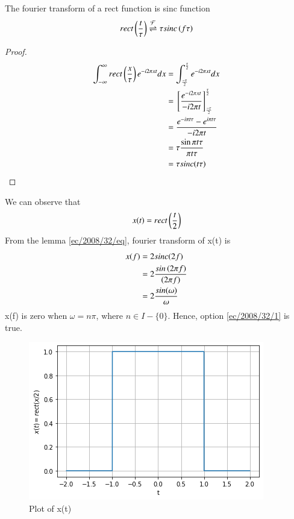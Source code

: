 
\begin{lemma}\label{ec/2008/32/eq}
The fourier transform of a rect function is sinc function 
\begin{align}
    rect\left(\frac{t}{\tau}\right) \overset{\mathcal{F}}{ \rightleftharpoons} \tau sinc\left(f\tau\right)
\end{align}
\begin{proof}
\begin{align}
    \int_{-\infty}^{\infty} rect\left(\frac{x}{\tau}\right) e^{-i2\pi xt} dx&= \int_{\frac{-\tau}{2}}^{\frac{\tau}{2}} e^{-i2\pi xt}dx\\
    &={}\left[\frac{e^{-i2\pi xt}}{-i2\pi t}\right]_{\frac{-\tau}{2}}^{\frac{\tau}{2}}\\
    &=\frac{e^{-i\pi t\tau}-e^{i\pi t\tau}}{-i2\pi t}\\
    &=\tau \frac{\sin{\pi t\tau}}{\pi t\tau}\\
    &=\tau sinc(t\tau)
\end{align} 
\end{proof}
\end{lemma}
We can observe that 
\begin{align}
    x(t)=rect\left(\frac{t}{2}\right)
\end{align}
From the lemma \ref{ec/2008/32/eq}, fourier transform of x(t) is 
\begin{align}
    x(f)&= 2 sinc(2f)\\ 
        &= 2 \frac{sin\left(2\pi f\right)}{\left(2 \pi f\right)}\\
        &= 2 \frac{sin(\omega)}{\omega}
\end{align}
x(f) is zero when $\omega=n\pi$, where $n\in I-\{0\}$. Hence, option \ref{ec/2008/32/1} is true.
\begin{figure}[!h]
 \centering
 \includegraphics[width=\columnwidth]{solutions/ec/2008/32/figs/rect.png}
 \caption{Plot of x(t)}
 \label{ec/2008/32/plot}
\end{figure}
